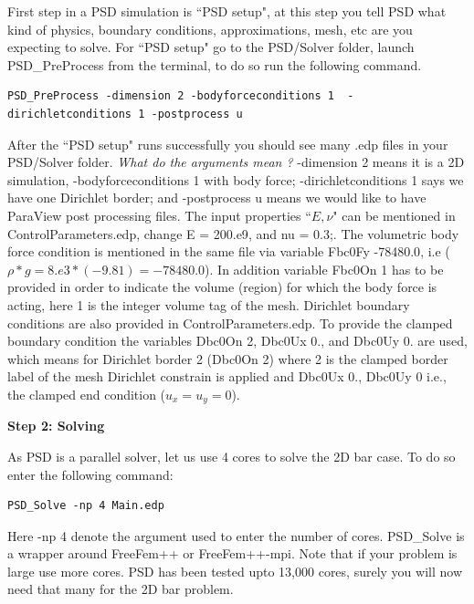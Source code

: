 \documentclass{report}
\begin{document}
First step in a PSD simulation is ``PSD setup", at this step you tell PSD what kind of physics, boundary conditions, approximations, mesh, etc are you expecting to solve.
For ``PSD setup" go to the {\ttfamily PSD/Solver} folder, launch  {\ttfamily PSD\_PreProcess} from the terminal, to do so run the following command.
\begin{lstlisting}[style=Linux]
PSD_PreProcess -dimension 2 -bodyforceconditions 1  -dirichletconditions 1 -postprocess u
\end{lstlisting}
%
After the ``PSD setup" runs successfully you should see many {\ttfamily .edp} files in your {\ttfamily PSD/Solver} folder. \textit{What do the arguments mean ?}  {\ttfamily -dimension 2} means it is a 2D simulation, {\ttfamily -bodyforceconditions 1} with body force; {\ttfamily -dirichletconditions 1} says we have one Dirichlet border; and {\ttfamily -postprocess u} means we would like to have ParaView post processing files. The input properties ``$E,\nu$" can be mentioned in {\ttfamily ControlParameters.edp}, change {\ttfamily E  = 200.e9}, and {\ttfamily nu = 0.3;}. The volumetric body force condition is mentioned in the same file via variable {\ttfamily Fbc0Fy -78480.0}, i.e ($\rho*g=8.e3*(-9.81)=-78480.0$). In addition variable {\ttfamily Fbc0On 1} has to be provided in order to indicate the volume (region) for which the body force is acting, here 1 is the integer volume tag of the mesh. Dirichlet boundary conditions are also provided in {\ttfamily ControlParameters.edp}. To provide the clamped boundary condition the variables   {\ttfamily Dbc0On 2}, {\ttfamily Dbc0Ux 0.}, and {\ttfamily Dbc0Uy 0.}  are used, which means for Dirichlet border 2 ({\ttfamily Dbc0On 2}) where 2 is the clamped border label of the mesh  Dirichlet constrain is applied and {{\ttfamily Dbc0Ux 0.}, {\ttfamily Dbc0Uy 0}} i.e., the clamped end condition ($u_x=u_y=0$).

\textbf{Step 2: Solving}

As PSD is a parallel solver, let us use  4 cores to solve the 2D bar case. To do so enter the following command:

\begin{lstlisting}[style=Linux]
PSD_Solve -np 4 Main.edp
\end{lstlisting}

Here {\ttfamily -np 4} denote the argument used to enter the number of cores. {\ttfamily PSD\_Solve} is a wrapper around {\ttfamily FreeFem++} or {\ttfamily FreeFem++-mpi}.  Note that if your problem is large use more cores. PSD has been tested upto 13,000 cores, surely you will now need that many for the 2D bar problem. 
\end{document}
